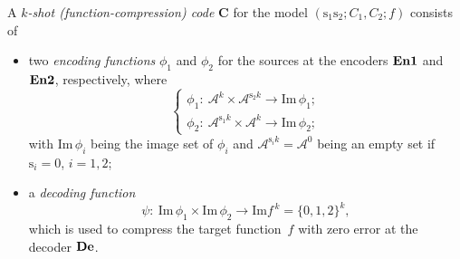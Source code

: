 \documentclass[11pt,draftclsnofoot,onecolumn]{IEEEtran}
\newcommand{\mbC}{\mathbf{C}}
\def\Im{\mathrm{Im}}
\newcommand{\Enone}{\bf{En1}}
\newcommand{\Entwo}{\bf{En2}}
\newcommand{\De}{\bf{De}}
\begin{document}
A \emph{$k$-shot (function-compression) code} $\mbC$ for the model $(\boldsymbol{\mathrm{s}}_1\boldsymbol{\mathrm{s}}_2;C_{1}, C_{2};  f)$  consists of
\begin{itemize}
\item two \emph{encoding functions} $\phi_{1}$ and $\phi_{2}$ for the sources  at the encoders $\Enone$ and $\Entwo$, respectively, where
\begin{equation}
\begin{cases}
 \phi_{1}:~ \mathcal{A}^{k}\times\mathcal{A}^{\boldsymbol{\mathrm{s}}_2k}\rightarrow \Im\,\phi_1; \\
 \phi_{2}:~ \mathcal{A}^{\boldsymbol{\mathrm{s}}_1k}\times\mathcal{A}^{k}\rightarrow \Im\,\phi_2;
 \end{cases}\label{dis-fun-model-encod-fun-def}
\end{equation}
with $\Im\,\phi_i$ being the image set of $\phi_i$ and $\mathcal{A}^{\boldsymbol{\mathrm{s}}_{i}k}=\mathcal{A}^{0}$ being an empty set if $\boldsymbol{\mathrm{s}}_i=0$, $i=1,2$;
\item
a \emph{decoding function}
\begin{equation}\nonumber
\psi:~\Im\,\phi_1\times\Im\,\phi_2\rightarrow \Im f^{\,k}=\{0,1,2\}^{k},
\end{equation}
  which is used to compress the target function~$f$ with zero error at the decoder $\De$.
    \end{itemize}
\end{document}

